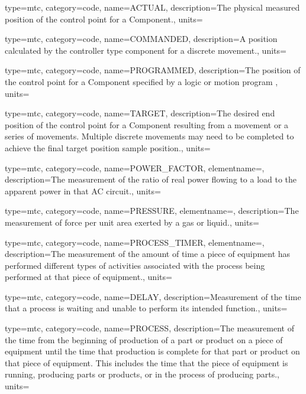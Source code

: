{
  type=mtc,
  category=code,
  name={ACTUAL},
  description={The physical measured position of the control point for a Component.},
  units=
}

{
  type=mtc,
  category=code,
  name={COMMANDED},
  description={A position calculated by the \gls{controller} type component for a discrete movement.},
  units=
}

{
  type=mtc,
  category=code,
  name={PROGRAMMED},
  description={The position of the control point for a Component specified by a logic or motion program },
  units=
}

{
  type=mtc,
  category=code,
  name={TARGET},
  description={The desired end position of the control point for a Component resulting from a movement or a series of movements.  Multiple discrete movements may need to be completed to achieve the final \gls{target position sample} position.},
  units=
}

{
  type=mtc,
  category=code,
  name={POWER\_FACTOR},
  elementname=,
  description={The measurement of the ratio of real power flowing to a load to the apparent power in that AC circuit.},
  units=
}

{
  type=mtc,
  category=code,
  name={PRESSURE},
  elementname=,
  description={The measurement of force per unit area exerted by a gas or liquid.},
  units=
}

{
  type=mtc,
  category=code,
  name={PROCESS\_TIMER},
  elementname=,
  description={The measurement of the amount of time a piece of equipment has performed different types of activities associated with the process being performed at that piece of equipment.},
  units=
}

{
  type=mtc,
  category=code,
  name={DELAY},
  description={Measurement of the time that a process is waiting and unable to perform its intended function.},
  units=
}

{
  type=mtc,
  category=code,
  name={PROCESS},
  description={The measurement of the time from the beginning of production of a part or product on a piece of equipment until the time that production is complete for that part or product on that piece of equipment.  This includes the time that the piece of equipment is running, producing parts or products, or in the process of producing parts.},
  units=
}

